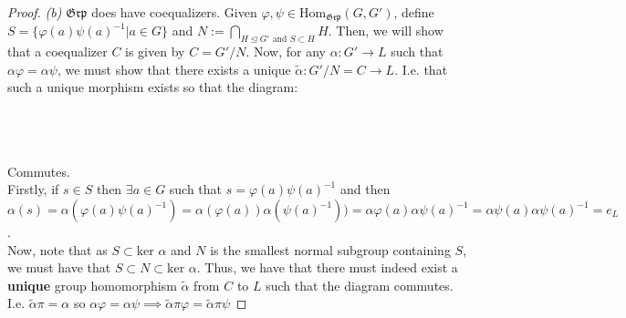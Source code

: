 \documentclass[12pt,letterpaper]{article}
\begin{document}
\begin{proof}
	\item\textit{(b)} $\mathfrak{Grp}$ does have coequalizers. Given $\varphi, \psi \in \mathrm{Hom}_{\mathfrak{Grp}}(G,G')$, define $S = \{\varphi(a)\psi(a)^{-1} | a\in G\}$ and $N := \bigcap_{H \trianglelefteq G' \text{ and } S \subset H} H$. Then, we will show that a coequalizer $C$ is given by $C = G'/N$. Now, for any $\alpha : G' \rightarrow L$ such that $\alpha\varphi = \alpha\psi$, we must show that there exists a unique $\tilde\alpha : G'/N = C \rightarrow L$. I.e. that such a unique morphism exists so that the diagram:\\\\
	\\\\
	Commutes.\\
	Firstly, if $s\in S$ then $\exists a\in G$ such that $s = \varphi(a)\psi(a)^{-1}$ and then $\alpha(s) = \alpha(\varphi(a)\psi(a)^{-1}) = \alpha(\varphi(a))\alpha(\psi(a)^{-1})) = \alpha\varphi(a)\alpha\psi(a)^{-1} = \alpha\psi(a)\alpha\psi(a)^{-1} = e_L$.\\
	Now, note that  as $S \subset \text{ker }\alpha$ and $N$ is the smallest normal subgroup containing $S$, we must have that $S\subset N \subset \text{ker }\alpha$. Thus, we have that there must indeed exist a \textbf{unique} group homomorphism $\tilde\alpha$ from $C$ to $L$ such that the diagram commutes. I.e. $\tilde\alpha\pi = \alpha$ so $\alpha\varphi = \alpha\psi \implies \tilde\alpha\pi\varphi = \tilde\alpha\pi\psi$
\end{proof}





\pagebreak
\end{document}
